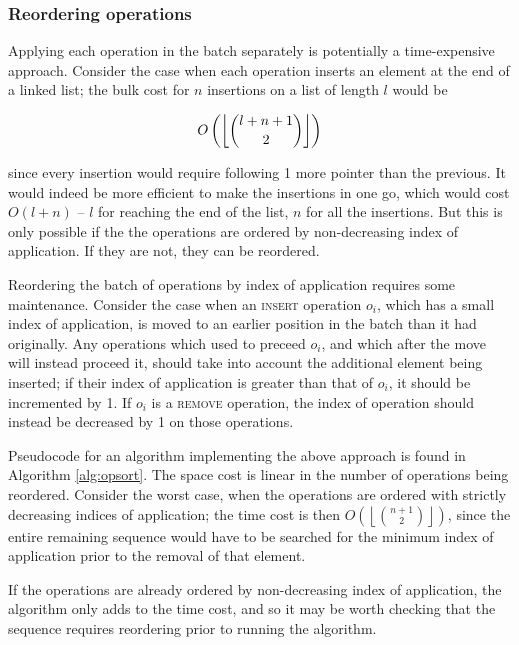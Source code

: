 \subsubsection{Reordering operations}

Applying each operation in the batch separately is potentially a time-expensive
approach. Consider the case when each operation inserts an element at the end of
a linked list; the bulk cost for $n$ insertions on a list of length $l$ would be

$$O\left(\left\lfloor\dbinom{l+n+1}{2}\right\rfloor\right)$$

since every insertion would require following 1 more pointer than the previous.
It would indeed be more efficient to make the insertions in one go, which would
cost $O(l+n)$ -- $l$ for reaching the end of the list, $n$ for all the
insertions. But this is only possible if the the operations are ordered by
non-decreasing index of application. If they are not, they can be reordered.

Reordering the batch of operations by index of application requires some
maintenance. Consider the case when an \textsc{insert} operation $o_i$, which
has a small index of application, is moved to an earlier position in the batch
than it had originally. Any operations which used to preceed $o_i$, and which
after the move will instead proceed it, should take into account the additional
element being inserted; if their index of application is greater than that of
$o_i$, it should be incremented by 1. If $o_i$ is a \textsc{remove} operation,
the index of operation should instead be decreased by 1 on those operations.

Pseudocode for an algorithm implementing the above approach is found in
Algorithm \ref{alg:opsort}. The space cost is linear in the number of operations
being reordered. Consider the worst case, when the operations are ordered with
strictly decreasing indices of application; the time cost is then
$O\left(\left\lfloor\binom{n+1}{2}\right\rfloor\right)$, since the entire
remaining sequence would have to be searched for the minimum index of
application prior to the removal of that element.

If the operations are already ordered by non-decreasing index of application,
the algorithm only adds to the time cost, and so it may be worth checking that
the sequence requires reordering prior to running the algorithm.


